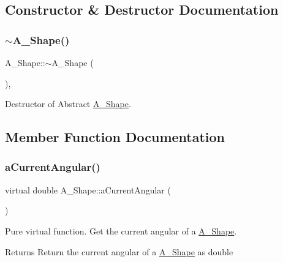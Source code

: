 \subsection{Constructor \& Destructor Documentation}
\mbox{\label{classA__Shape_ad0a3bcb28f3d4f42043ea8c592bb5f1f}} 
\subsubsection{\texorpdfstring{$\sim$\+A\+\_\+\+Shape()}{~A\_Shape()}}
{\footnotesize\ttfamily A\+\_\+\+Shape\+::$\sim$\+A\+\_\+\+Shape (\begin{DoxyParamCaption}{ }\end{DoxyParamCaption})\hspace{0.3cm}{\ttfamily [pure virtual]}, {\ttfamily [default]}}



Destructor of Abstract \hyperlink{classA__Shape}{A\+\_\+\+Shape}. 



\subsection{Member Function Documentation}
\mbox{\label{classA__Shape_a80fa4e009c875dd0ba7fc5bfeeb43f98}} 
\subsubsection{\texorpdfstring{a\+Current\+Angular()}{aCurrentAngular()}}
{\footnotesize\ttfamily virtual double A\+\_\+\+Shape\+::a\+Current\+Angular (\begin{DoxyParamCaption}{ }\end{DoxyParamCaption})\hspace{0.3cm}{\ttfamily [pure virtual]}}



Pure virtual function. Get the current angular of a \hyperlink{classA__Shape}{A\+\_\+\+Shape}. 

\begin{DoxyReturn}{Returns}
Return the current angular of a \hyperlink{classA__Shape}{A\+\_\+\+Shape} as double 
\end{DoxyReturn}


